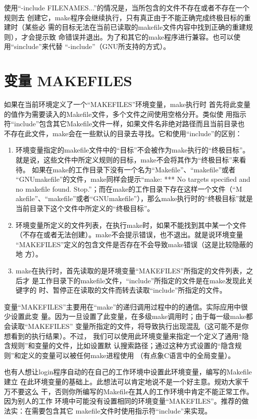 使用“-include FILENAMES...”的情况是，当所包含的文件不存在或者不存在一个规则去
创建它，make程序会继续执行，只有真正由于不能正确完成终极目标的重建时（某些必
需的目标无法在当前已读取的makefile文件内容中找到正确的重建规则），才会提示致
命错误并退出。为了和其它的make程序进行兼容。也可以使用“sinclude”来代替
“-include”（GNU所支持的方式）。

\section{变量 MAKEFILES}
如果在当前环境定义了一个“MAKEFILES”环境变量，make执行时
首先将此变量的值作为需要读入的Makefile文件，多个文件之间使用空格分开。类似使
用指示符“include”包含其它Makefile文件一样，如果文件名非绝对路径而且当前目录也
不存在此文件，make会在一些默认的目录去寻找。它和使用“include”的区别：

\begin{enumerate}
\itemsep=0pt \parskip=0pt
\item 环境变量指定的makefile文件中的“目标”不会被作为make执行的“终极目标”。
    就是说，这些文件中所定义规则的目标，make不会将其作为“终极目标”来看待。
    如果在make的工作目录下没有一个名为“Makefile”、“makefile”或者
    “GNUmakefile”的文件，make同样会提示“make: *** No targets specified and
    no makefile found. Stop.”；而在make的工作目录下存在这样一个文件（“M
    akefile”、“makefile”或者“GNUmakefile”），那么make执行时的“终极目标”就是
    当前目录下这个文件中所定义的“终极目标”。
\item 环境变量所定义的文件列表，在执行make时，如果不能找到其中某一个文件
    （不存在或者无法创建）。make不会提示错误，也不退出。就是说环境变量
    “MAKEFILES”定义的包含文件是否存在不会导致make错误（这是比较隐蔽的地
    方）。
\item make在执行时，首先读取的是环境变量“MAKEFILES”所指定的文件列表，之后才
    是工作目录下的makefile文件，“include”所指定的文件是在make发现此关键字的
    时、暂停正在读取的文件而转去读取“include”所指定的文件。
\end{enumerate}

变量“MAKEFILES”主要用在“make”的递归调用过程中的的通信。实际应用中很少设置此变
量。因为一旦设置了此变量，在多级make调用时；由于每一级make都会读取“MAKEFILES”
变量所指定的文件，将导致执行出现混乱（这可能不是你想看到的执行结果）。不过，
我们可以使用此环境变量来指定一个定义了通用“隐含规则”和变量的文件，比如设置默
认搜索路径；通过这种方式设置的“隐含规则”和定义的变量可以被任何make进程使用
（有点象C语言中的全局变量）。

也有人想让login程序自动的在自己的工作环境中设置此环境变量，编写的Makefile建立
在此环境变量的基础上。此想法可以肯定地说不是一个好主意。规劝大家千万不要这么
干，否则你所编写的Makefile在其人的工作环境中肯定不能正常工作。因为别人的工作
环境中可能没有设置相同的环境变量“MAKEFILES”。推荐的做法实：在需要包含其它
makefile文件时使用指示符“include”来实现。


